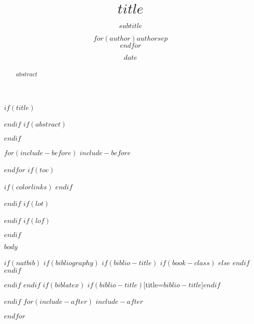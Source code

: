 \documentclass[$if(fontsize)$$fontsize$,$endif$$if(lang)$$babel-lang$,$endif$$if(papersize)$$papersize$paper,$endif$$for(classoption)$$classoption$$sep$,$endfor$]{$documentclass$}
\title{$title$}
\title{}
\subtitle{$subtitle$}
\author{$for(author)$$author$$sep$ \\ $endfor$}
\author{}
\date{$date$}
\date{}
\makeatletter
\newcommand{\fontd}{\fontsize{13}{16}\selectfont}
\renewcommand\tableofcontents{%
    \@starttoc{toc}%
}
\makeatother
\begin{document}
$if(title)$
\maketitle
$endif$
$if(abstract)$
\begin{abstract}
$abstract$
\end{abstract}
$endif$

$for(include-before)$
$include-before$

$endfor$
$if(toc)$
{
$if(colorlinks)$
\hypersetup{linkcolor=$if(toccolor)$$toccolor$$else$black$endif$}
$endif$


\setcounter{tocdepth}{$toc-depth$}

\tableofcontents
}
$endif$
$if(lot)$
\listoftables
$endif$
$if(lof)$
\listoffigures
$endif$

\raggedright
\fontd
$body$

$if(natbib)$
$if(bibliography)$
$if(biblio-title)$
$if(book-class)$
\renewcommand\bibname{$biblio-title$}
$else$
\renewcommand\refname{$biblio-title$}
$endif$
$endif$


$endif$
$endif$
$if(biblatex)$
\printbibliography$if(biblio-title)$[title=$biblio-title$]$endif$

$endif$
$for(include-after)$
$include-after$

$endfor$
\end{document}

